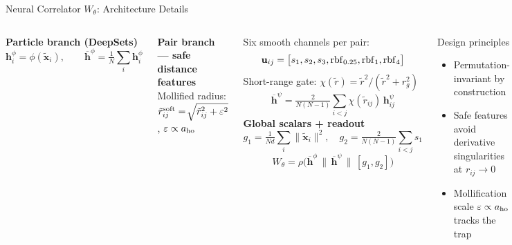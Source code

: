 \documentclass[aspectratio=169,10pt]{beamer}
\begin{document}
\begin{frame}{Neural Correlator $W_\theta$: Architecture Details}
  \begin{columns}[T]
      \textbf{Particle branch (DeepSets)}
      \[
        \mathbf h_i^\phi = \phi(\tilde{\mathbf x}_i),\qquad
        \overline{\mathbf h}^\phi
        = \tfrac{1}{N}\textstyle\sum_i \mathbf h_i^\phi
      \]

      \textbf{Pair branch — safe distance features}\\
      Mollified radius: $\tilde r_{ij}^{\rm soft}=\!\sqrt{\tilde r_{ij}^2
        +\varepsilon^2}$,\; $\varepsilon\propto a_{\rm ho}$

      Six smooth channels per pair:
      \[
        \mathbf u_{ij}=\bigl[s_1,s_2,s_3,{\rm rbf}_{0.25},{\rm rbf}_1,{\rm rbf}_4\bigr]
      \]
      Short-range gate: $\chi(\tilde r)=\tilde r^2/(\tilde r^2+r_g^2)$
      \[
        \overline{\mathbf h}^\psi
        = \tfrac{2}{N(N-1)}\textstyle\sum_{i<j}
          \chi(\tilde r_{ij})\,\mathbf h^\psi_{ij}
      \]
      \textbf{Global scalars + readout}
      \[
        g_1 = \tfrac{1}{Nd}\textstyle\sum_i\!\|\tilde{\mathbf x}_i\|^2,\quad
        g_2 = \tfrac{2}{N(N-1)}\textstyle\sum_{i<j} s_1
      \]
      \[
        W_\theta = \rho\!\bigl(\overline{\mathbf h}^\phi\,\|\,
        \overline{\mathbf h}^\psi\,\|\,[g_1,g_2]\bigr)
      \]
      \vspace{0.2cm}
      \begin{alertblock}{Design principles}
        \begin{itemize}
          \item Permutation-invariant by construction
          \item Safe features avoid derivative singularities at $r_{ij}\to0$
          \item Mollification scale $\varepsilon\propto a_{\rm ho}$ tracks the trap
        \end{itemize}
      \end{alertblock}
  \end{columns}
\end{frame}
\end{document}
